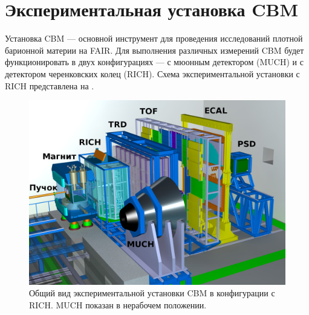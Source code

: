 
\section{Экспериментальная установка CBM}\label{sec:secCbmSetup}

Установка CBM --- основной инструмент для проведения исследований плотной барионной материи на FAIR. Для выполнения различных измерений CBM будет функционировать в двух конфигурациях --- с мюонным детектором (MUCH) и с детектором черенковских колец (RICH). Схема экспериментальной установки с RICH представлена на .

\begin{figure}[H]
\includegraphics[width=1.0\textwidth]{pictures/1_CBM_SIS100_with_names.png}
\caption{Общий вид экспериментальной установки CBM в конфигурации с RICH. MUCH показан в нерабочем положении.}
\label{fig:CBM}
\end{figure}

